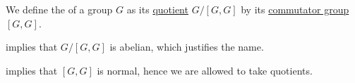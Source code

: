 \begin{definition}\label{def:group_abelianization}
   We define the  of a group \( G \) as its \hyperref[def:group/quotient]{quotient} \( G / [G, G] \) by its \hyperref[def:group_commutator]{commutator group} \( [G, G] \).
\end{definition}
\begin{comments}
  \item {} implies that \( G / [G, G] \) is abelian, which justifies the name.
\end{comments}
\begin{defproof}
   implies that \( [G, G] \) is normal, hence we are allowed to take quotients.
\end{defproof}

